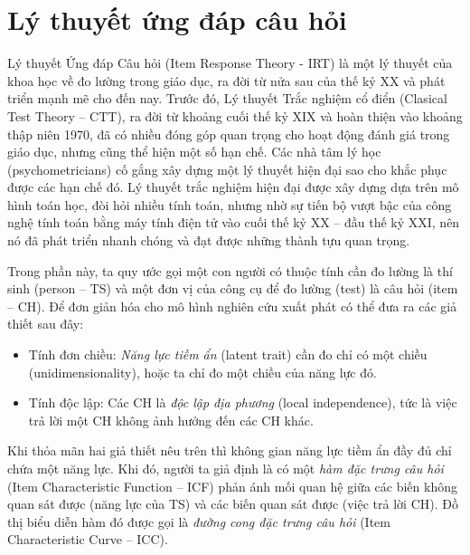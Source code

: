 \section{Lý thuyết ứng đáp câu hỏi}
Lý thuyết Ứng đáp Câu hỏi (Item Response Theory - IRT) là một lý thuyết của khoa học về đo lường trong giáo dục, ra đời từ nửa sau của thế kỷ XX và phát triển mạnh mẽ cho đến nay. Trước đó, Lý thuyết Trắc nghiệm cổ điển (Clasical Test Theory – CTT), ra đời từ khoảng cuối thế kỷ XIX và hoàn thiện vào khoảng thập niên 1970, đã có nhiều đóng góp quan trọng cho hoạt động đánh giá trong giáo dục, nhưng cũng thể hiện một số hạn chế. Các nhà tâm lý học (psychometricians) cố gắng xây dựng một lý thuyết hiện đại sao cho khắc phục được các hạn chế đó. Lý thuyết trắc nghiệm hiện đại được xây dựng dựa trên mô hình toán học, đòi hỏi nhiều tính toán, nhưng nhờ sự tiến bộ vượt bậc của công nghệ tính toán bằng máy tính điện tử vào cuối thế kỷ XX – đầu thế kỷ XXI, nên nó đã phát triển nhanh chóng và đạt được những thành tựu quan trọng.\par
Trong phần này, ta quy ước gọi một con người có thuộc tính cần đo lường là thí sinh (person – TS) và một đơn vị của công cụ để đo lường (test) là câu hỏi (item – CH). Để đơn giản hóa cho mô hình nghiên cứu xuất phát có thể đưa ra các giả thiết sau đây:\par
\begin{itemize}
	\item Tính đơn chiều: \textit{Năng lực tiềm ẩn} (latent trait) cần đo chỉ có một chiều (unidimensionality), hoặc ta chỉ đo một chiều của năng lực đó.
	\item Tính độc lập: Các CH là \textit{độc lập địa phương} (local independence), tức là việc trả lời một CH không ảnh hưởng đến các CH khác.
\end{itemize}
Khi thỏa mãn hai giả thiết nêu trên thì không gian năng lực tiềm ẩn đầy đủ chỉ chứa một năng lực. Khi đó, người ta giả định là có một \textit{hàm đặc trưng câu hỏi} (Item Characteristic Function – ICF) phản ánh mối quan hệ giữa các biến không quan sát được (năng lực của TS) và các biến quan sát được (việc trả lời CH). Đồ thị biểu diễn hàm đó được gọi là \textit{đường cong đặc trưng câu hỏi} (Item Characteristic Curve – ICC).
